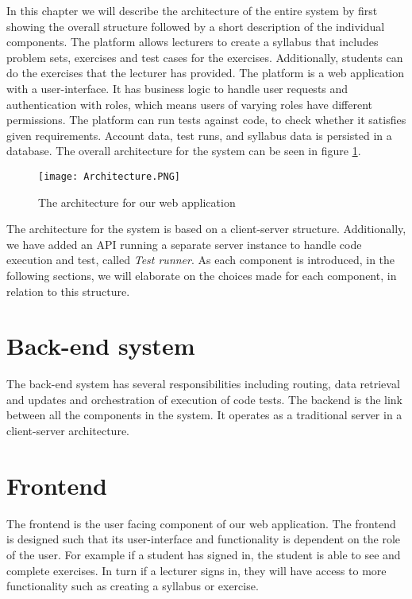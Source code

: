 In this chapter we will describe the architecture of the entire system by first showing the overall structure followed by a short description of the individual components. 
The platform allows lecturers to create a syllabus that includes problem sets, exercises and test cases for the exercises. Additionally, students can do the exercises that the lecturer has provided. 
The platform is a web application with a user-interface. It has business logic to handle user requests and authentication with roles, which means users of varying roles have different permissions. The platform can run tests against code, to check whether it satisfies given requirements. Account data, test runs, and syllabus data is persisted in a database.
The overall architecture for the system can be seen in figure \ref{fig:Architecture}.

\begin{figure}[H]
	\texttt{[image: Architecture.PNG]}
	\centering
	\caption{The architecture for our web application}
	\label{fig:Architecture}
\end{figure}

The architecture for the system is based on a client-server structure. Additionally, we have added an API running a separate server instance to handle code execution and test, called \textit{Test runner}. As each component is introduced, in the following sections, we will elaborate on the choices made for each component, in relation to this structure.

\section{Back-end system}
The back-end system has several responsibilities including routing, data retrieval and updates and orchestration of execution of code tests. The backend is the link between all the components in the system. It operates as a traditional server in a client-server architecture. 

\section{Frontend}
The frontend is the user facing component of our web application. The frontend is designed such that its user-interface and functionality is dependent on the role of the user. 
For example if a student has signed in, the student is able to see and complete exercises. In turn if a lecturer signs in, they will have access to more functionality such as creating a syllabus or exercise.

